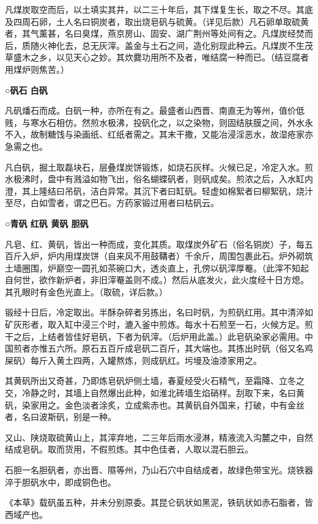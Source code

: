 \documentclass[]{article}
\begin{document}
凡煤炭取空而后，以土填实其井，以二三十年后，其下煤复生长，取之不尽。其底及四周石卵，土人名曰铜炭者，取出烧皂矾与硫黄。（详见后款）凡石卵单取硫黄者，其气薰甚，名曰臭煤，燕京房山、固安、湖广荆州等处间有之。凡煤炭经焚而后，质随火神化去，总无灰滓。盖金与土石之间，造化别现此种云。凡煤炭不生茂草盛木之乡，以见天心之妙。其炊爨功用所不及者，唯结腐一种而已。（结豆腐者用煤炉则焦苦。）

\textbf{○矾石 白矾}

凡矾燔石而成。白矾一种，亦所在有之。最盛者山西晋、南直无为等州，值价低贱，与寒水石相仿。然煎水极沸，投矾化之，以之染物，则固结肤膜之间，外水永不入，故制糖饯与染画纸、红纸者需之。其末干撒，又能冶浸淫恶水，故湿疮家亦急需之也。

凡白矾，掘土取磊块石，层叠煤炭饼锻炼，如烧石灰样。火候已足，冷定入水。煎水极沸时，盘中有溅溢如物飞出，俗名蝴蝶矾者，则矾成矣。煎浓之后，入水缸内澄，其上隆结曰吊矾，洁白异常。其沉下者曰缸矾。轻虚如棉絮者曰柳絮矾，烧汁至尽，白如雪者，谓之巴石。方药家锻过用者曰枯矾云。

\textbf{○青矾 红矾 黄矾 胆矾}

凡皂、红、黄矾，皆出一种而成，变化其质。取煤炭外矿石（俗名铜炭）子，每五百斤入炉，炉内用煤炭饼（自来风不用鼓鞲者）千余斤，周围包裹此石。炉外砌筑土墙圈围，炉巅空一圆孔如茶碗口大，透炎直上，孔傍以矾滓厚罨。（此滓不知起自何世，欲作新炉者，非旧滓罨盖则不成。）然后从底发火，此火度经十日方熄。其孔眼时有金色光直上。（取硫，详后款。）

锻经十日后，冷定取出。半酥杂碎者另拣出，名曰时矾，为煎矾红用。其中清淬如矿灰形者，取入缸中浸三个时，漉入釜中煎炼。每水十石煎至一石，火候方足。煎干之后，上结者皆佳好皂矾，下者为矾滓。（后炉用此盖。）此皂矾染家必需用。中国煎者亦惟五六所。原石五百斤成皂矾二百斤，其大端也。其拣出时矾（俗又名鸡屎矾）每斤入黄土四两，入罐熬炼，则成矾红。圬墁及油漆家用之。

其黄矾所出又奇甚，乃即炼皂矾炉侧土墙，春夏经受火石精气，至霜降、立冬之交，冷静之时，其墙上自然爆出此种，如淮北砖墙生焰硝样。刮取下来，名曰黄矾，染家用之。金色淡者涂炙，立成紫赤也。其黄矾自外国来，打破，中有金丝者，名曰波斯矾，别是一种。

又山、陕烧取硫黄山上，其滓弃地，二三年后雨水浸淋，精液流入沟麓之中，自然结成皂矾。取而货用，不假煎炼。其中色佳者，人取以混石胆云。

石胆一名胆矾者，亦出晋、隰等州，乃山石穴中自结成者，故绿色带宝光。烧铁器淬于胆矾水中，即成铜色也。

《本草》载矾虽五种，并未分别原委。其昆仑矾状如黑泥，铁矾状如赤石脂者，皆西域产也。
\end{document}
